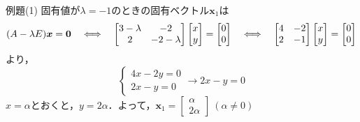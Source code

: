 \begin{tip}{例題(1)}
	固有値が$\lambda = -1$のときの固有ベクトル$\bm{x}_1$は
	\begin{equation*}
		(A - \lambda E)\bm{x} = \bm{0} \quad\Longleftrightarrow\quad \begin{bmatrix}
			3 - \lambda & -2\\ 2 & -2 - \lambda
		\end{bmatrix}
		\begin{bmatrix}
			x\\ y
		\end{bmatrix} =
		\begin{bmatrix}
			0\\ 0
		\end{bmatrix} \quad\Longleftrightarrow\quad
		\begin{bmatrix}
			4 & -2\\ 2 & -1
		\end{bmatrix}
		\begin{bmatrix}
			x\\ y
		\end{bmatrix} =
		\begin{bmatrix}
			0\\ 0
		\end{bmatrix}
	\end{equation*}
	より，
	\begin{equation*}
		\begin{cases*}
			4x - 2y = 0\\ 2x - y = 0
		\end{cases*}
		\longrightarrow 2x - y = 0
	\end{equation*}
	$x = \alpha$とおくと，$y = 2\alpha$．よって，$\bm{x}_1 =
	\begin{bmatrix}
		\alpha\\ 2\alpha
	\end{bmatrix}\ (\alpha \ne 0)$


\end{tip}
